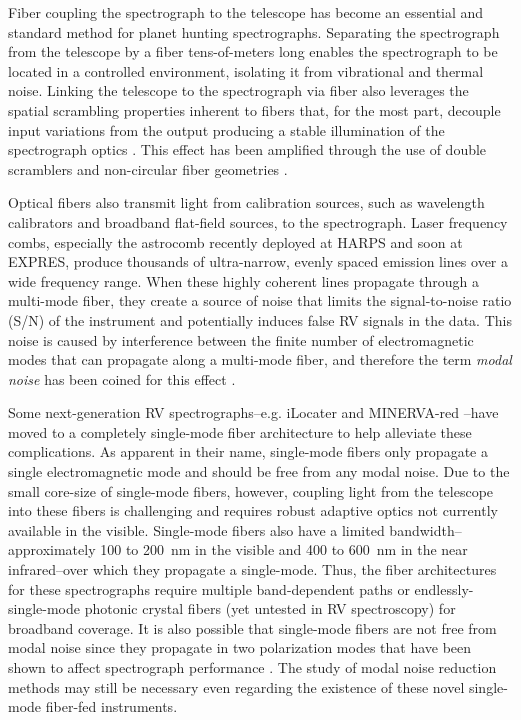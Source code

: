 \documentclass[twocolumn]{emulateapj}
\begin{document}
Fiber coupling the spectrograph to the telescope has become an essential and standard method for planet hunting spectrographs. Separating the spectrograph from the telescope by a fiber tens-of-meters long enables the spectrograph to be located in a controlled environment, isolating it from vibrational and thermal noise. Linking the telescope to the spectrograph via fiber also leverages the spatial scrambling properties inherent to fibers that, for the most part, decouple input variations from the output producing a stable illumination of the spectrograph optics \citep{Hunter1992}. This effect has been amplified through the use of double scramblers \citep{Halverson2015a, Spronck2015} and non-circular fiber geometries \citep{Chazelas2010, Spronck2012, Plavchan2013}.

Optical fibers also transmit light from calibration sources, such as wavelength calibrators and broadband flat-field sources, to the spectrograph. Laser frequency combs, especially the  astrocomb \citep{Probst2014} recently deployed at HARPS and soon at EXPRES, produce thousands of ultra-narrow, evenly spaced emission lines over a wide frequency range. When these highly coherent lines propagate through a multi-mode fiber, they create a source of noise that limits the signal-to-noise ratio (S/N) of the instrument and potentially induces false RV signals in the data. This noise is caused by interference between the finite number of electromagnetic modes that can propagate along a multi-mode fiber, and therefore the term \textit{modal noise} has been coined for this effect \citep{Epworth1978}.

Some next-generation RV spectrographs--e.g. iLocater \citep{Crepp2016} and MINERVA-red \citep{Blake2015}--have moved to a completely single-mode fiber architecture to help alleviate these complications. As apparent in their name, single-mode fibers only propagate a single electromagnetic mode and should be free from any modal noise. Due to the small core-size of single-mode fibers, however, coupling light from the telescope into these fibers is challenging and requires robust adaptive optics not currently available in the visible. Single-mode fibers also have a limited bandwidth--approximately 100 to \SI{200}{\nano\meter} in the visible and 400 to \SI{600}{\nano\meter} in the near infrared--over which they propagate a single-mode. Thus, the fiber architectures for these spectrographs require multiple band-dependent paths or endlessly-single-mode photonic crystal fibers (yet untested in RV spectroscopy) for broadband coverage. It is also possible that single-mode fibers are not free from modal noise since they propagate in two polarization modes that have been shown to affect spectrograph performance \citep{Halverson2015b}. The study of modal noise reduction methods may still be necessary even regarding the existence of these novel single-mode fiber-fed instruments.
\end{document}
